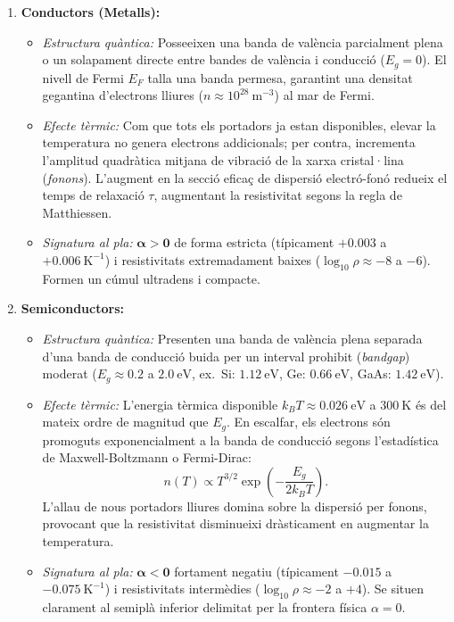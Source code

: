 \documentclass[a4paper,11pt]{article}
\begin{document}
\begin{enumerate}
    \item \textbf{Conductors (Metalls):}
    \begin{itemize}
        \item \emph{Estructura quàntica:} Posseeixen una banda de valència parcialment plena o un solapament directe entre bandes de valència i conducció ($E_g = 0$). El nivell de Fermi $E_F$ talla una banda permesa, garantint una densitat gegantina d'electrons lliures ($n \approx 10^{28}\ \text{m}^{-3}$) al mar de Fermi.
        \item \emph{Efecte tèrmic:} Com que tots els portadors ja estan disponibles, elevar la temperatura no genera electrons addicionals; per contra, incrementa l'amplitud quadràtica mitjana de vibració de la xarxa cristal·lina (\emph{fonons}). L'augment en la secció eficaç de dispersió electró-fonó redueix el temps de relaxació $\tau$, augmentant la resistivitat segons la regla de Matthiessen.
        \item \emph{Signatura al pla:} $\mathbf{\alpha > 0}$ de forma estricta (típicament $+0.003$ a $+0.006\ \text{K}^{-1}$) i resistivitats extremadament baixes ($\log_{10}\rho \approx -8$ a $-6$). Formen un cúmul ultradens i compacte.
    \end{itemize}

    \item \textbf{Semiconductors:}
    \begin{itemize}
        \item \emph{Estructura quàntica:} Presenten una banda de valència plena separada d'una banda de conducció buida per un interval prohibit (\emph{bandgap}) moderat ($E_g \approx 0.2$ a $2.0\ \text{eV}$, ex.\ Si: $1.12\ \text{eV}$, Ge: $0.66\ \text{eV}$, GaAs: $1.42\ \text{eV}$).
        \item \emph{Efecte tèrmic:} L'energia tèrmica disponible $k_B T \approx 0.026\ \text{eV}$ a $300\ \text{K}$ és del mateix ordre de magnitud que $E_g$. En escalfar, els electrons són promoguts exponencialment a la banda de conducció segons l'estadística de Maxwell-Boltzmann o Fermi-Dirac:
        \begin{equation}
            n(T) \propto T^{3/2} \exp\left(-\frac{E_g}{2 k_B T}\right).
        \end{equation}
        L'allau de nous portadors lliures domina sobre la dispersió per fonons, provocant que la resistivitat disminueixi dràsticament en augmentar la temperatura.
        \item \emph{Signatura al pla:} $\mathbf{\alpha < 0}$ fortament negatiu (típicament $-0.015$ a $-0.075\ \text{K}^{-1}$) i resistivitats intermèdies ($\log_{10}\rho \approx -2$ a $+4$). Se situen clarament al semiplà inferior delimitat per la frontera física $\alpha = 0$.
    \end{itemize}


\end{enumerate}
\end{document}
